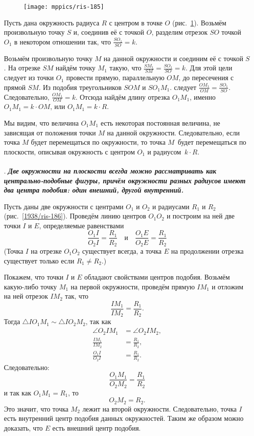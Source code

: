 \documentclass[oneside]{book}
\begin{document}
\begin{figure}[h]
\centering
\texttt{[image: mppics/ris-185]}
\caption{}\label{1938/ris-185}
\end{figure}

Пусть дана окружность радиуса $R$ с центром в точке $O$ (рис.~\ref{1938/ris-185}).
Возьмём произвольную точку $S$ и, соединив её с точкой $O$, разделим отрезок $SO$ точкой $O_1$ в некотором отношении так, что $\frac{SO_1}{SO}= k$.

Возьмём произвольную точку $M$ на данной окружности и соединим её с точкой $S$.
На отрезке $SM$ найдём точку $M_1$ такую, что $\frac{SM_1}{SM}=\frac{SO_1}{SO}= k$.
Для этой цели следует из точки $O_1$ провести прямую, параллельную $OM$, до пересечения с прямой $SM$.
Из подобия треугольников $SOM$ и $SO_1M_1$.
следует $\frac{OM_1}{OM}=\frac{SO_1}{SO}$.
Следовательно, $\frac{OM_1}{OM}=k$.
Отсюда найдём длину отрезка $O_1M_1$, именно $O_1M_1=k\cdot OM$, или $O_1M_1=k\cdot R$.

Мы видим, что величина $O_1M_1$ есть некоторая постоянная величина, не зависящая от положения точки $M$ на данной окружности.
Следовательно, если точка $M$ будет перемещаться по окружности, то точка $M$\ будет перемещаться по плоскости, описывая окружность с центром $O_1$ и радиусом~$k\cdot R$.

\paragraph{}\label{1938/179}
.
\textbf{\emph{Две окружности на плоскости всегда можно рассматривать как центрально-подобные фигуры, причём окружности разных радиусов имеют два центра подобия:
один внешний, другой внутренний.}} 

Пусть даны две окружности с центрами $O_1$ и $O_2$ и радиусами $R_1$ и $R_2$ (рис.~\ref{1938/ris-186}).
Проведём линию центров $O_1O_2$ и построим на ней две точки $I$ и $E$, определяемые равенствами
\[\frac{O_1I}{O_2I}=\frac{R_1}{R_2}\quad\text{и}\quad\frac{O_1E}{O_2E}=\frac{R_1}{R_2}\]
(Точка $I$ на отрезке $O_1O_2$ существует всегда, а точка $E$ на продолжении отрезка существует только если $R_1\ne R_2$.)

Покажем, что точки $I$ и $E$ обладают свойствами центров подобия.
Возьмём какую-либо точку $M_1$ на первой окружности, проведём прямую $IM_1$ и отложим на ней отрезок $IM_2$ так, что 
\[\frac{IM_1}{IM_2}=\frac{R_1}{R_2}.\] 
Тогда $\triangle IO_1M_1\sim\triangle IO_2M_2$, так как 
\begin{align*}
\angle O_2IM_1&=\angle O_2IM_2,
\\
\frac{IM_1}{IM_2}&=\frac{R_1}{R_2},
\\
\frac{O_1I}{O_2I}&=\frac{R_1}{R_2}.
\end{align*}
Следовательно:
\[\frac{O_1M_1}{O_2M_2}=\frac{R_1}{R_2}\]
и так как $O_1M_1=R_1$, то
\[O_2M_2=R_2.\]
Это значит, что точка $M_2$ лежит на второй окружности.
Следовательно, точка $I$ есть внутренний центр подобия данных окружностей.
Таким же образом можно доказать, что $E$ есть внешний центр подобия.
\end{document}
